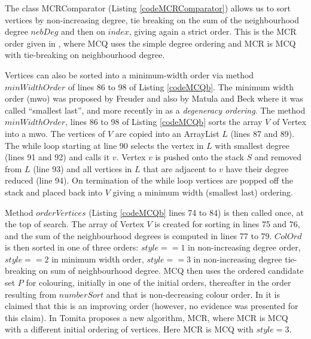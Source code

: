\documentclass{l4proj}
\begin{document}
\begin{figure}

\end{figure}

The class MCRComparator (Listing \ref{codeMCRComparator}) allows us to sort vertices by non-increasing degree, tie breaking on
the sum of the neighbourhood degree $nebDeg$ and then on $index$, giving again a strict order. This is the MCR order given
in \cite{tomita2007}, where MCQ uses the simple degree ordering and MCR is MCQ with tie-breaking on neighbourhood degree. 

\begin{figure}

\end{figure}

Vertices can also be sorted into a minimum-width order via method $minWidthOrder$ of lines 86 to 98 of Listing \ref{codeMCQb}.
The minimum width order (mwo) was proposed by Freuder \cite{freuder} and also by Matula and Beck \cite{matulaBeck} where it was called 
``smallest last'', and more recently in \cite{eppstein2011} as a \emph{degeneracy ordering}.
The method $minWidthOrder$, lines 86 to 98 of Listing \ref{codeMCQb} sorts the array $V$ of Vertex into a mwo.
The vertices of $V$ are copied into an ArrayList $L$ (lines 87 and 89). The while loop starting at line 90 selects the vertex
in $L$ with smallest degree (lines 91 and 92) and calls it $v$. Vertex $v$ is pushed onto the stack $S$ and removed from $L$ (line
93) and all vertices in $L$ that are adjacent to $v$ have their degree reduced (line 94). On termination
of the while loop vertices are popped off the stack and placed back into $V$ giving a minimum width (smallest last) ordering.

\begin{figure}

\end{figure}

Method $orderVertices$ (Listing \ref{codeMCQb} lines 74 to 84) is then called once, at the top of search. The array
of Vertex $V$ is created for sorting in lines 75 and 76, and the sum of the neighbourhood degrees is 
computed in lines 77 to 79. $ColOrd$ is then sorted in one of three orders: $style == 1$ in non-increasing degree order,
$style == 2$ in minimum width order, $style == 3$ in non-increasing degree tie-breaking on sum of neighbourhood degree.
MCQ then uses the ordered candidate set $P$ for colouring, initially in one of the initial orders, thereafter in the 
order resulting from $numberSort$ and that is non-decreasing colour order. In \cite{tomita2003} it is claimed that this is
an improving order (however, no evidence was presented for this claim). In \cite{tomita2007} Tomita proposes a new algorithm,
MCR, where MCR is MCQ with a different initial ordering of vertices. Here MCR is MCQ with $style = 3$.
\end{document}
